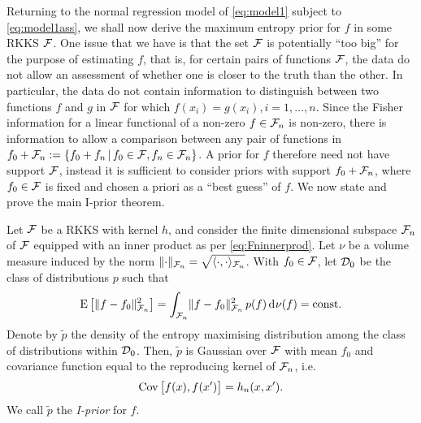 Returning to the normal regression model of \cref{eq:model1} subject to \cref{eq:model1ass}, we shall now derive the maximum entropy prior for $f$ in some RKKS ${\mathcal F}$.
One issue that we have is that the set ${\mathcal F}$ is potentially ``too big'' for the purpose of estimating $f$, that is, for certain pairs of functions ${\mathcal F}$, the data do not allow an assessment of whether one is closer to the truth than the other.
In particular, the data do not contain information to distinguish between two functions $f$ and $g$ in ${\mathcal F}$ for which $f(x_i) = g(x_i), i=1,\dots,n$.
Since the Fisher information for a linear functional of a non-zero $f \in {\mathcal F}_n$ is non-zero, there is information to allow a comparison between any pair of functions in $f_0 + {\mathcal F}_n := \{f_0 + f_n \,|\, f_0 \in {\mathcal F}, f_n \in {\mathcal F}_n \}$.
A prior for $f$ therefore need not have support ${\mathcal F}$, instead it is sufficient to consider priors with support $f_0 + {\mathcal F}_n$, where $f_0 \in {\mathcal F}$ is fixed and chosen a priori as a ``best guess'' of $f$.
We now state and prove the main I-prior theorem.

\begin{theorem}[I-prior]
  Let ${\mathcal F}$ be a RKKS with kernel $h$, and consider the finite dimensional subspace ${\mathcal F}_n$ of ${\mathcal F}$ equipped with an inner product as per \cref{eq:Fninnerprod}.
  Let $\nu$ be a volume measure induced by the norm $\lVert\cdot\rVert_{{\mathcal F}_n} = \sqrt{\langle\cdot,\cdot\rangle_{{\mathcal F}_n}}$.
  With $f_0 \in {\mathcal F}$, let ${\mathcal D}_0$ be the class of distributions $p$ such that 
  \[
    \operatorname{E}\big[\lVert f-f_0\rVert^2_{{\mathcal F}_n}\big] = \int_{{\mathcal F}_n} \lVert f-f_0\rVert^2_{{\mathcal F}_n} \, p(f) \operatorname{d}\hspace{0.5pt}\! \nu(f) = \text{const.}\hspace{0.01em}
  \]
  Denote by $\tilde p$ the density of the entropy maximising distribution among the class of distributions within ${\mathcal D}_0$.
  Then, $\tilde p$ is Gaussian over ${\mathcal F}$ with mean $f_0$ and covariance function equal to the reproducing kernel of ${\mathcal F}_n$, i.e.
  \[
    \operatorname{Cov}\big[f(x),f(x')\big] = h_n(x,x').
  \]
  We call $\tilde p$ the \emph{I-prior} for $f$.
\end{theorem}

